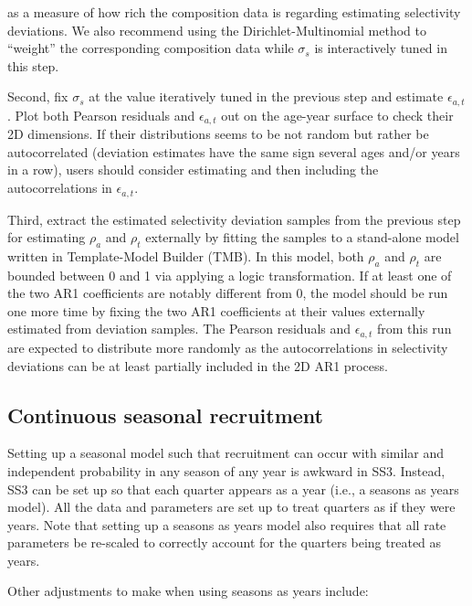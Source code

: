 as a measure of how rich the composition data is regarding estimating selectivity deviations. We also recommend using the Dirichlet-Multinomial method to ``weight'' the corresponding composition data while $\sigma_s$ is interactively tuned in this step.

Second, fix $\sigma_s$ at the value iteratively tuned in the previous step and estimate $\epsilon_{a,t}$. Plot both Pearson residuals and $\epsilon_{a,t}$ out on the age-year surface to check their 2D dimensions. If their distributions seems to be not random but rather be autocorrelated (deviation estimates have the same sign several ages and/or years in a row), users should consider estimating and then including the autocorrelations in $\epsilon_{a,t}$.

Third, extract the estimated selectivity deviation samples from the previous step for estimating $\rho_a$ and $\rho_t$ externally by fitting the samples to a stand-alone model written in Template-Model Builder (TMB). In this model, both $\rho_a$ and $\rho_t$ are bounded between 0 and 1 via applying a logic transformation. If at least one of the two AR1 coefficients are notably different from 0, the model should be run one more time by fixing the two AR1 coefficients at their values externally estimated from deviation samples. The Pearson residuals and $\epsilon_{a,t}$ from this run are expected to distribute more randomly as the  autocorrelations in selectivity deviations can be at least partially included in the 2D AR1 process.

\hypertarget{continuous-seasonal-recruitment-sec}{}
\subsection{Continuous seasonal recruitment}
Setting up a seasonal model such that recruitment can occur with similar and independent probability in any season of any year is awkward in SS3.  Instead, SS3 can be set up so that each quarter appears as a year (i.e., a seasons as years model).  All the data and parameters are set up to treat quarters as if they were years. Note that setting up a seasons as years model also requires that all rate parameters be re-scaled to correctly account for the quarters being treated as years.

Other adjustments to make when using seasons as years include:

